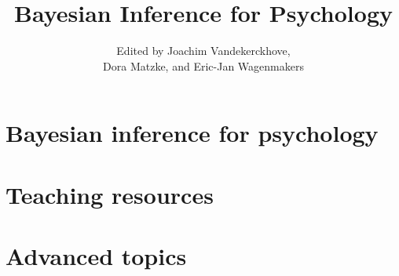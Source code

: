 \documentclass[letter,12pt]{book}
\title{Bayesian Inference for Psychology}
\author{Edited by Joachim Vandekerckhove,\\Dora Matzke, and Eric-Jan Wagenmakers}
\begin{document}
\thispagestyle{empty}


\frontmatter

  \maketitle


  \tableofcontents

  
\mainmatter

\part{Bayesian inference for psychology}


\part{Teaching resources}

  
\part{Advanced topics}


\backmatter

  
\end{document}
